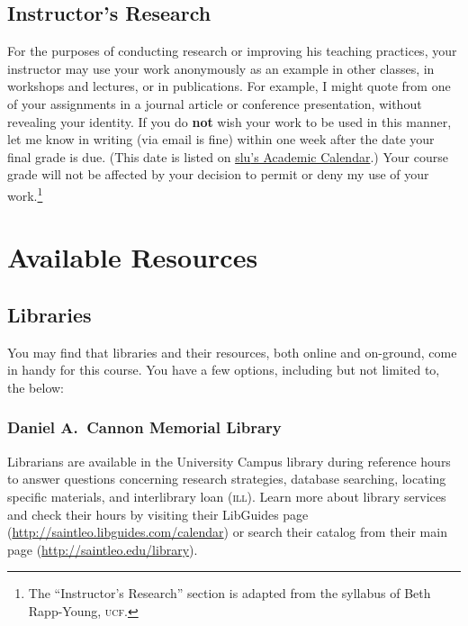 \documentclass[11pt,oneside]{amsart}	%
\begin{document}
\subsection{Instructor's Research} %
\label{sub:instructor_s_research}
For the purposes of conducting research or improving his teaching practices, your instructor may use your work anonymously as an example in other classes, in workshops and lectures, or in publications. For example, I might quote from one of your assignments in a journal article or conference presentation, without revealing your identity. If you do \textbf{not} wish your work to be used in this manner, let me know in writing (via email is fine) within one week after the date your final grade is due. (This date is listed on \href{http://www.saintleo.edu/resources/academic-catalogs-schedules-calendars.aspx}{\ac{slu}'s Academic Calendar}.) Your course grade will not be affected by your decision to permit or deny my use of your work.\footnote{The ``Instructor's Research'' section is adapted from the syllabus of Beth Rapp-Young, \textsc{ucf}.}

\section{Available Resources} %
\label{sec:available_resources}
\subsection{Libraries} %
\label{sub:library_resources}
You may find that libraries and their resources, both online and on-ground, come in handy for this course. You have a few options, including but not limited to, the below:

\subsubsection{Daniel A.\ Cannon Memorial Library} %
\label{ssub:cannon_memorial_library}
Librarians are available in the University Campus library during reference hours to answer questions concerning research strategies, database searching, locating specific materials, and interlibrary loan (\textsc{ill}). Learn more about library services and check their hours by visiting their LibGuides page (\href{http://saintleo.libguides.com/calendar}{http://saintleo.libguides.com/calendar}) or search their catalog from their main page (\href{http://saintleo.edu/library}{http://saintleo.edu/library}).
\end{document}
